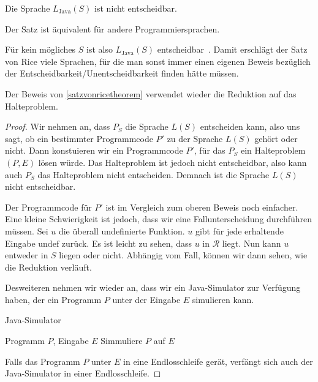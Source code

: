 \documentclass[journal]{IEEEtran}
\begin{document}
\begin{theorem}
\label{satzvonricetheorem}
  Die Sprache $L_\text{Java}(S)$ ist nicht entscheidbar.
\end{theorem}

Der Satz ist äquivalent für andere Programmiersprachen.

Für kein mögliches $S$ ist also $L_\text{Java}(S)$ entscheidbar~\cite{satzvonricebraun}. Damit erschlägt der Satz von Rice viele Sprachen, für die man sonst immer einen eigenen Beweis bezüglich der Entscheidbarkeit/Unentscheidbarkeit finden hätte müssen.

Der Beweis von \ref{satzvonricetheorem} verwendet wieder die Reduktion auf das Halteproblem.

\begin{proof}

Wir nehmen an, dass $P_S$ die Sprache $L(S)$ entscheiden kann, also uns sagt, ob ein bestimmter Programmcode $P'$ zu der Sprache $L(S)$ gehört oder nicht. Dann konstuieren wir ein Programmcode $P'$, für das $P_S$ ein Halteproblem $(P, E)$ lösen würde. Das Halteproblem ist jedoch nicht entscheidbar, also kann auch $P_S$ das Halteproblem nicht entscheiden. Demnach ist die Sprache $L(S)$ nicht entscheidbar.

Der Programmcode für $P'$ ist im Vergleich zum oberen Beweis noch einfacher. Eine kleine Schwierigkeit ist jedoch, dass wir eine Fallunterscheidung durchführen müssen. Sei $u$ die überall undefinierte Funktion. $u$ gibt für jede erhaltende Eingabe $\mathrm{undef}$ zurück. Es ist leicht zu sehen, dass $u$ in $\mathcal{R}$ liegt. Nun kann $u$ entweder in $S$ liegen oder nicht. Abhängig vom Fall, können wir dann sehen, wie die Reduktion verläuft.

Desweiteren nehmen wir wieder an, dass wir ein Java-Simulator zur Verfügung haben, der ein Programm $P$ unter der Eingabe $E$ simulieren kann.

\begin{algorithm}[H]
\caption{Java-Simulator}
\begin{algorithmic}[1]
\renewcommand{\algorithmicrequire}{\textbf{Input:}}
\renewcommand{\algorithmicensure}{\textbf{Output:}}
\REQUIRE Programm $P$, Eingabe $E$
\STATE Simmuliere $P$ auf $E$
\end{algorithmic}
\end{algorithm}

Falls das Programm $P$ unter $E$ in eine Endlosschleife gerät, verfängt sich auch der Java-Simulator in einer Endlosschleife.


\end{proof}
\end{document}
